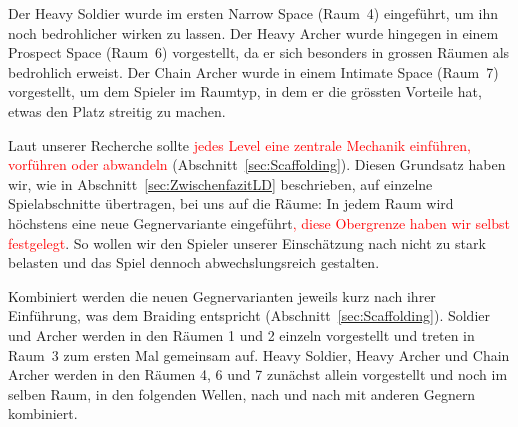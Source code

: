 \documentclass[../Main.tex]{subfiles}
\begin{document}
Der Heavy Soldier wurde im ersten Narrow Space (Raum~4) eingeführt, um ihn noch bedrohlicher wirken zu lassen. Der Heavy Archer wurde hingegen in einem Prospect Space (Raum~6) vorgestellt, da er sich besonders in grossen Räumen als bedrohlich erweist. Der Chain Archer wurde in einem Intimate Space (Raum~7) vorgestellt, um dem Spieler im Raumtyp, in dem er die grössten Vorteile hat, etwas den Platz streitig zu machen.

Laut unserer Recherche sollte \textcolor{red}{jedes Level eine zentrale Mechanik einführen, vorführen oder abwandeln} (Abschnitt~\ref{sec:Scaffolding}). Diesen Grundsatz haben wir, wie in Abschnitt~\ref{sec:ZwischenfazitLD} beschrieben, auf einzelne Spielabschnitte übertragen, bei uns auf die Räume: In jedem Raum wird höchstens eine neue Gegnervariante eingeführt\textcolor{red}{, diese Obergrenze haben wir selbst festgelegt}. So wollen wir den Spieler unserer Einschätzung nach nicht zu stark belasten und das Spiel dennoch abwechslungsreich gestalten.

Kombiniert werden die neuen Gegnervarianten jeweils kurz nach ihrer Einführung, was dem Braiding entspricht (Abschnitt~\ref{sec:Scaffolding}). Soldier und Archer werden in den Räumen 1 und 2 einzeln vorgestellt und treten in Raum~3 zum ersten Mal gemeinsam auf. Heavy Soldier, Heavy Archer und Chain Archer werden in den Räumen 4, 6 und 7 zunächst allein vorgestellt und noch im selben Raum, in den folgenden Wellen, nach und nach mit anderen Gegnern kombiniert.
\end{document}

